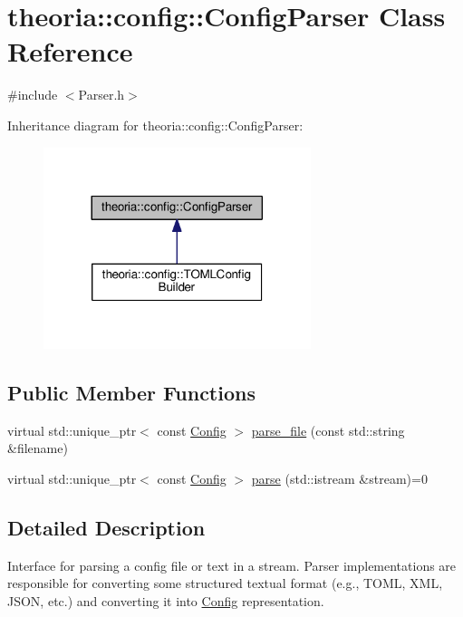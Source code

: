 \hypertarget{classtheoria_1_1config_1_1ConfigParser}{}\section{theoria\+:\+:config\+:\+:Config\+Parser Class Reference}
\label{classtheoria_1_1config_1_1ConfigParser}


{\ttfamily \#include $<$Parser.\+h$>$}



Inheritance diagram for theoria\+:\+:config\+:\+:Config\+Parser\+:\nopagebreak
\begin{figure}[H]
\begin{center}
\leavevmode
\includegraphics[width=221pt]{classtheoria_1_1config_1_1ConfigParser__inherit__graph}
\end{center}
\end{figure}
\subsection*{Public Member Functions}
\begin{DoxyCompactItemize}
\item 
virtual std\+::unique\+\_\+ptr$<$ const \hyperlink{classtheoria_1_1config_1_1Config}{Config} $>$ \hyperlink{classtheoria_1_1config_1_1ConfigParser_a4eca80a9831324237f2a2aa9a5018c89}{parse\+\_\+file} (const std\+::string \&filename)
\item 
virtual std\+::unique\+\_\+ptr$<$ const \hyperlink{classtheoria_1_1config_1_1Config}{Config} $>$ \hyperlink{classtheoria_1_1config_1_1ConfigParser_af0ccd3cc2202c3d588a977c611dfa988}{parse} (std\+::istream \&stream)=0
\end{DoxyCompactItemize}


\subsection{Detailed Description}
Interface for parsing a config file or text in a stream. Parser implementations are responsible for converting some structured textual format (e.\+g., T\+O\+ML, X\+ML, J\+S\+ON, etc.) and converting it into \hyperlink{classtheoria_1_1config_1_1Config}{Config} representation. 

